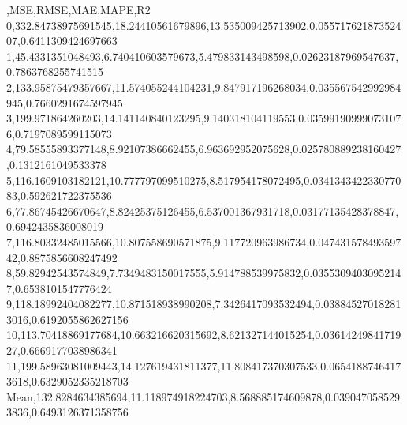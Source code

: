 ,MSE,RMSE,MAE,MAPE,R2
0,332.84738975691545,18.24410561679896,13.535009425713902,0.05571762187352407,0.6411309424697663
1,45.4331351048493,6.740410603579673,5.479833143498598,0.02623187969547637,0.7863768255741515
2,133.95875479357667,11.574055244104231,9.847917196268034,0.035567542992984945,0.7660291674597945
3,199.971864260203,14.141140840123295,9.140318104119553,0.035991909990731076,0.7197089599115073
4,79.58555893377148,8.92107386662455,6.963692952075628,0.025780889238160427,0.1312161049533378
5,116.1609103182121,10.777797099510275,8.517954178072495,0.034134342233077083,0.592621722375536
6,77.86745426670647,8.82425375126455,6.537001367931718,0.03177135428378847,0.6942435836008019
7,116.80332485015566,10.807558690571875,9.117720963986734,0.04743157849359742,0.8875856608247492
8,59.82942543574849,7.7349483150017555,5.914788539975832,0.03553094030952147,0.6538101547776424
9,118.18992404082277,10.871518938990208,7.3426417093532494,0.038845270182813016,0.6192055862627156
10,113.70418869177684,10.663216620315692,8.621327144015254,0.0361424984171927,0.6669177038986341
11,199.58963081009443,14.127619431811377,11.808417370307533,0.06541887464173618,0.6329052335218703
Mean,132.8284634385694,11.118974918224703,8.568885174609878,0.0390470585293836,0.6493126371358756
